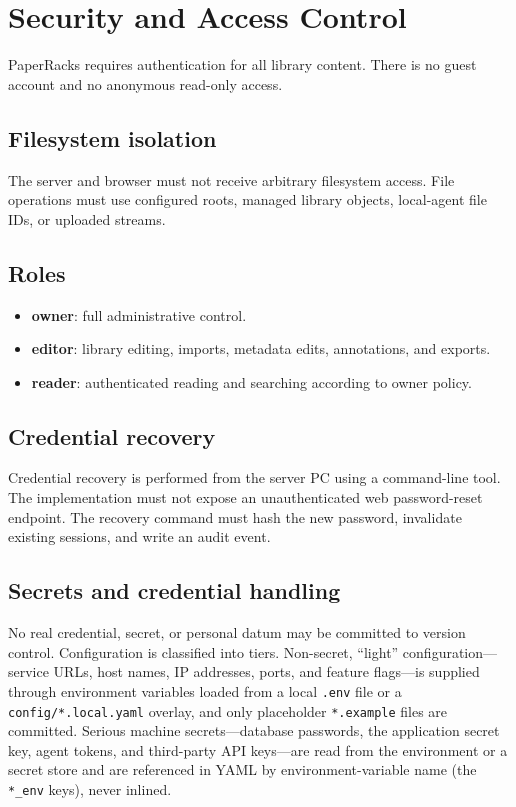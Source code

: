 \section{Security and Access Control}

PaperRacks requires authentication for all library content. There is no guest account and no anonymous read-only access.

\subsection{Filesystem isolation}

The server and browser must not receive arbitrary filesystem access. File operations must use configured roots, managed library objects, local-agent file IDs, or uploaded streams.

\subsection{Roles}

\begin{itemize}[noitemsep]
  \item \textbf{owner}: full administrative control.
  \item \textbf{editor}: library editing, imports, metadata edits, annotations, and exports.
  \item \textbf{reader}: authenticated reading and searching according to owner policy.
\end{itemize}

\subsection{Credential recovery}

Credential recovery is performed from the server PC using a command-line tool. The implementation must not expose an unauthenticated web password-reset endpoint. The recovery command must hash the new password, invalidate existing sessions, and write an audit event.

\subsection{Secrets and credential handling}

No real credential, secret, or personal datum may be committed to version control. Configuration is classified into tiers. Non-secret, ``light'' configuration---service URLs, host names, IP addresses, ports, and feature flags---is supplied through environment variables loaded from a local \texttt{.env} file or a \texttt{config/*.local.yaml} overlay, and only placeholder \texttt{*.example} files are committed. Serious machine secrets---database passwords, the application secret key, agent tokens, and third-party API keys---are read from the environment or a secret store and are referenced in YAML by environment-variable name (the \texttt{*\_env} keys), never inlined.

